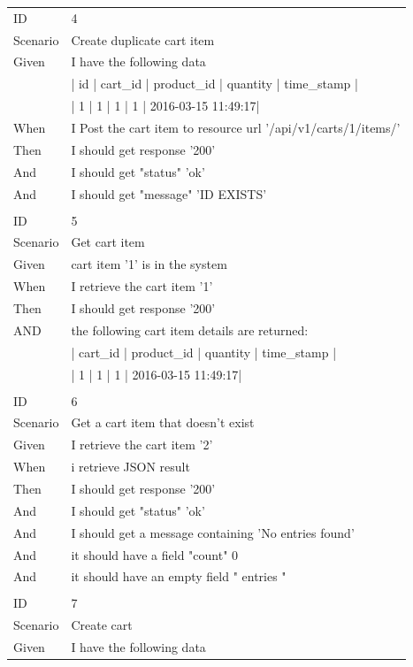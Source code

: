 \documentclass{report}
\begin{document}
\begin{tabular}{ l l }
ID 			& 4 \\
Scenario		& Create duplicate cart item \\
Given 		& I have the following data \\
     		& | id | cart\_id | product\_id | quantity   | time\_stamp |\\
     		& | 1  | 1       | 1          | 1          | 2016-03-15 11:49:17|\\
When 		& I Post the cart item to resource url  '/api/v1/carts/1/items/' \\
Then 		& I should get response '200' \\
And 			& I should get "status" 'ok'\\
And 			& I should get "message" 'ID EXISTS' \\ \\
ID 			& 5 \\
Scenario		& Get cart item \\
Given 		& cart item '1' is in the system \\
When 		& I retrieve the cart item '1' \\
Then 		& I should get response '200' \\
AND 			& the following cart item details are returned: \\
			& | cart\_id | product\_id | quantity   | time\_stamp         | \\
     		& | 1       | 1          | 1          | 2016-03-15 11:49:17| \\ \\
ID 			& 6 \\
Scenario		& Get a cart item that doesn't exist \\
Given 		& I retrieve the cart item '2' \\
When 		& i retrieve JSON result \\
Then 		& I should get response '200' \\
And 			& I should get "status" 'ok' \\
And 			& I should get a message containing 'No entries found' \\
And 			& it should have a field "count" 0 \\
And 			& it should have an empty field " entries " \\ \\
ID 			& 7 \\
Scenario		& Create cart \\
Given 		& I have the following data \\

\end{tabular}
\end{document}
